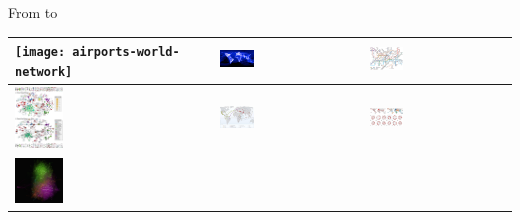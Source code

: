\documentclass[8pt]{beamer}
\begin{document}
\begin{frame}
\frametitle{\insertsection}

From {\color{blue}{natural}} to {\color{blue}{social phenomena}}

\begin{table}
\begin{tabular}{|C|C|C|}
\midrule
\texttt{[image: airports-world-network]} &
\includegraphics[width=0.25\textwidth, height=0.25\textheight, keepaspectratio]{facebook} &
\includegraphics[width=0.25\textwidth, height=0.25\textheight, keepaspectratio]{tube} \\
\midrule
\includegraphics[width=0.25\textwidth, height=0.25\textheight, keepaspectratio]{disease_net} &
\includegraphics[width=0.25\textwidth, height=0.25\textheight, keepaspectratio]{crime} &
\includegraphics[width=0.25\textwidth, height=0.25\textheight, keepaspectratio]{outbreak} \\
\midrule
\includegraphics[width=0.25\textwidth, height=0.25\textheight, keepaspectratio]{marvel} &

\end{tabular}
\end{table}
\end{frame}
\end{document}
